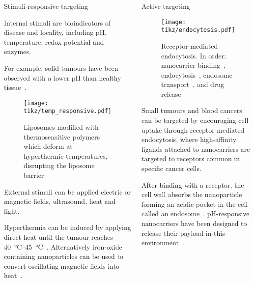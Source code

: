 \documentclass[final]{beamer}
\newcommand\tikznum[1]{{\tikz[baseline=(char.base)]{%
    \node [%
      circle,
      fill=blue-palatinate,
      text=white,
      inner sep=0.5pt,
      font=\scriptsize
    ] (char) {\textnormal{#1}};}}}
\begin{document}
\begin{frame}[plain]
\begin{columns}[t,onlytextwidth]
\begin{block}{Stimuli-responsive targeting\strut}
        \alert{Internal stimuli} are bioindicators of disease and locality, including \alert{pH}, \alert{temperature}, \alert{redox potential} and \alert{enzymes}.

        For example, solid tumours have been observed with a lower pH than healthy tissue~\cite{tannock1989acid,gerweck1996cellular}.

        \begin{figure}
          \centering
          \texttt{[image: tikz/temp\_responsive.pdf]}
          \caption{Liposomes modified with thermosensitive polymers which deform at hyperthermic temperatures, disrupting the liposome barrier~\cite{ta2013thermosensitive,kono2001thermosensitive}}
          \label{fig:thermo}
        \end{figure}

        \alert{External stimuli} can be applied \alert{electric} or \alert{magnetic} fields, \alert{ultrasound}, \alert{heat} and \alert{light}.

        Hyperthermia can be induced by applying direct heat until the tumour reaches \SIrange{40}{45}{\degreeCelsius}~\cite{ganta2008review,jhaveri2014stimuli}. Alternatively iron-oxide containing nanoparticles can be used to convert oscillating magnetic fields into heat~\cite{scherer2002magnetofection}.

        \vspace{1ex}
      \end{block}

      \begin{block}{Active targeting\strut}
        \begin{figure}
          \centering
          \texttt{[image: tikz/endocytosis.pdf]}
          \caption{Receptor-mediated endocytosis. In order: nanocarrier binding~\tikznum{1}, endocytosis~\tikznum{2}, endosome transport~\tikznum{3}, and drug release~\tikznum{4}}
        \end{figure}

        Small tumours and blood cancers can be targeted by encouraging cell uptake through \alert{receptor-mediated endocytosis}, where high-affinity \alert{ligands attached to nanocarriers} are  \alert{targeted to receptors} common in specific cancer cells.

        After binding with a receptor, the \alert{cell wall absorbs the nanoparticle} forming an acidic pocket in the cell called an \alert{endosome}~\cite{gerweck1996cellular}. pH-responsive nanocarriers have been designed to release their payload in this environment~\cite{sun2014engineered}.


\end{block}
\end{columns}
\end{frame}
\end{document}
